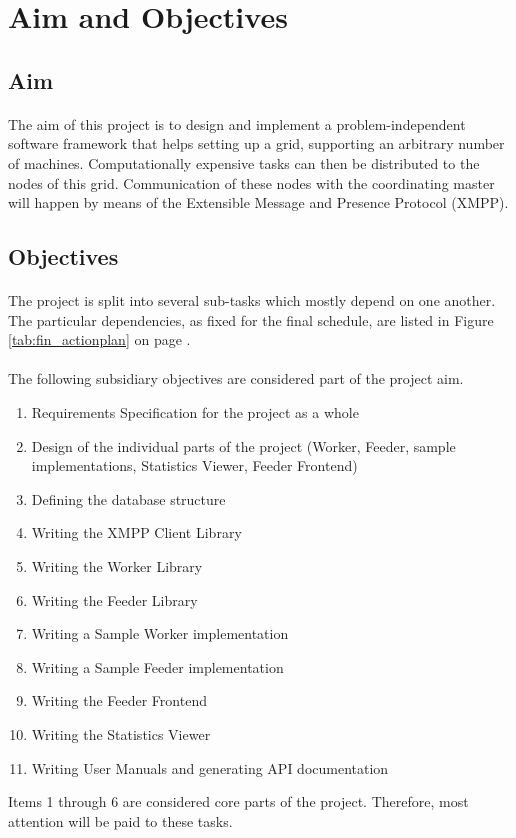 \section{Aim and Objectives}

\subsection{Aim}
\paragraph{}
The aim of this project is to design and implement a prob\-lem-in\-de\-pen\-dent software framework that helps setting up a grid, supporting an arbitrary number of machines. Computationally expensive tasks can then be distributed to the nodes of this grid. Communication of these nodes with the coordinating master will happen by means of the Extensible Message and Presence Protocol (XMPP).

\subsection{Objectives}
\paragraph{}
The project is split into several sub-tasks which mostly depend on one another. The particular dependencies, as fixed for the final schedule, are listed in Figure \ref{tab:fin_actionplan} on page \pageref{tab:fin_actionplan}.

\paragraph{}
The following subsidiary objectives are considered part of the project aim.
\begin{enumerate}
\item Requirements Specification for the project as a whole
\item Design of the individual parts of the project (Worker, Feeder, sample implementations, Statistics Viewer, Feeder Frontend)
\item Defining the database structure
\item Writing the XMPP Client Library
\item Writing the Worker Library
\item Writing the Feeder Library
\item Writing a Sample Worker implementation
\item Writing a Sample Feeder implementation
\item Writing the Feeder Frontend
\item Writing the Statistics Viewer
\item Writing User Manuals and generating API documentation
\end{enumerate}
Items 1 through 6 are considered core parts of the project. Therefore, most attention will be paid to these tasks.
